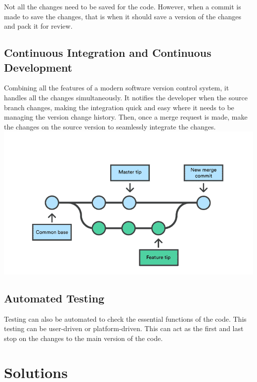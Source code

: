\documentclass[
  man]{apa7}
\begin{document}
Not all the changes need to be saved for the code. However, when a commit is made to save the changes, that is when it should save a version of the changes and pack it for review.

\hypertarget{continuous-integration-and-continuous-development}{%
\subsection{Continuous Integration and Continuous Development}\label{continuous-integration-and-continuous-development}}

Combining all the features of a modern software version control system, it handles all the changes simultaneously. It notifies the developer when the source branch changes, making the integration quick and easy where it needs to be managing the version change history. Then, once a merge request is made, make the changes on the source version to seamlessly integrate the changes.
\includegraphics{pipeline.png}

\hypertarget{automated-testing}{%
\subsection{Automated Testing}\label{automated-testing}}

Testing can also be automated to check the essential functions of the code. This testing can be user-driven or platform-driven. This can act as the first and last stop on the changes to the main version of the code.

\hypertarget{solutions}{%
\section{Solutions}\label{solutions}}
\end{document}
